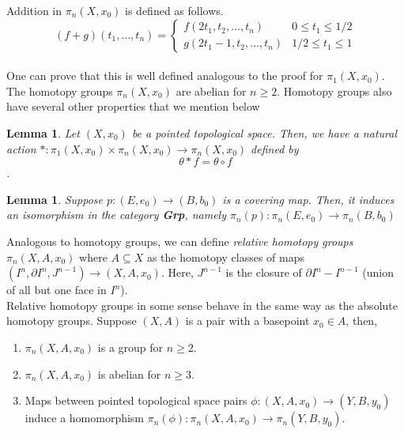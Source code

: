 \documentclass[12pt]{extarticle}
\numberwithin{equation}{section}
\newtheorem{lem}[thm]{Lemma}
\begin{document}
Addition in $\pi_n(X,x_0)$ is defined as follows.\\
\[(f+g)(t_1,\dots,t_n) =
\begin{cases}
    f(2t_1,t_2,\dots,t_n) & 0\leq t_1 \leq 1/2\\
    g(2t_1-1,t_2,\dots,t_n) & 1/2\leq t_1 \leq 1
\end{cases}\]\\

One can prove that this is well defined analogous to the proof for $\pi_1(X,x_0)$. The homotopy groups $\pi_n(X,x_0)$ are abelian for $n\geq 2$. Homotopy groups also have several other properties that we mention below\\


\begin{lem}\cite[p.~342]{Hatcher}
Let $(X,x_0)$ be a pointed topological space. Then, we have a natural action $\ast: \pi_1(X,x_0)\times \pi_n(X,x_0)\to \pi_n(X,x_0)$ defined by \[\theta \ast f = \theta\circ f \].

\end{lem}

\begin{lem}\cite[p.~342]{Hatcher}
Suppose $p:(E,e_0)\to (B,b_0)$ is a covering map. Then, it induces an isomorphism in the category \textbf{Grp}, namely $\pi_n(p):\pi_n(E,e_0)\to \pi_n(B,b_0)$
\end{lem}

Analogous to homotopy groups, we can define \emph{relative homotopy groups} $\pi_n(X,A,x_0)$ where $A\subseteq X$ as the homotopy classes of maps $(I^n, \partial I^n, J^{n-1})\to (X,A,x_0)$. Here, $J^{n-1}$ is the closure of $\partial I^n - I^{n-1}$ (union of all but one face in $I^n$).\\

Relative homotopy groups in some sense behave in the same way as the absolute homotopy groups. Suppose $(X,A)$ is a pair with a basepoint $x_0\in A$, then, 

\begin{enumerate}
    \item  $\pi_n(X,A,x_0)$ is a group for $n\geq 2$.
    \item $\pi_n(X,A,x_0)$ is abelian for $n\geq 3$.
    \item Maps between pointed topological space pairs $\phi:(X,A,x_0)\to (Y,B,y_0)$ induce a homomorphism $\pi_n(\phi):\pi_n(X,A,x_0)\to \pi_n(Y,B,y_0)$.\\
\end{enumerate}
\end{document}
